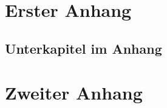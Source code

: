 \section{Erster Anhang}
\lipsum[1]

\subsection{Unterkapitel im Anhang}
\lipsum[1-6]
\section{Zweiter Anhang}
\lipsum[1-6]
